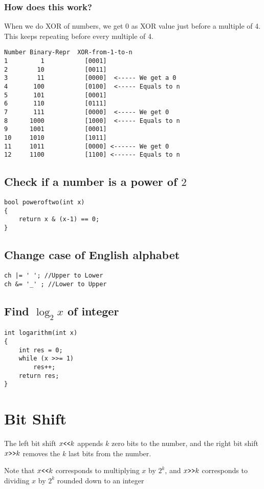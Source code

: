 \documentclass[twoside,12pt,a4paper,english]{book}
\theoremstyle{definition}
\theoremstyle{problemstyle}
\theoremstyle{problemstyle}
\theoremstyle{problemstyle}
\begin{document}
\subsubsection{How does this work?}
When we do XOR of numbers, we get 0 as XOR value just before a multiple of 4. This keeps repeating before every multiple of 4.
\begin{lstlisting}
Number Binary-Repr  XOR-from-1-to-n
1         1           [0001]
2        10           [0011]
3        11           [0000]  <----- We get a 0
4       100           [0100]  <----- Equals to n
5       101           [0001]
6       110           [0111]
7       111           [0000]  <----- We get 0
8      1000           [1000]  <----- Equals to n
9      1001           [0001]
10     1010           [1011]
11     1011           [0000] <------ We get 0
12     1100           [1100] <------ Equals to n
\end{lstlisting}
\newpage
\subsection{Check if a number is a power of \texorpdfstring{$2$}{2}}
\begin{lstlisting}
bool poweroftwo(int x)
{
    return x & (x-1) == 0;
}
\end{lstlisting}
\subsection{Change case of English alphabet}
\begin{lstlisting}
ch |= ' '; //Upper to Lower
ch &= '_' ; //Lower to Upper
\end{lstlisting}
\subsection{Find \texorpdfstring{$\log_2 x$}{log} of integer}
\begin{lstlisting}
int logarithm(int x)
{
    int res = 0;
    while (x >>= 1)
        res++;
    return res;
}
\end{lstlisting}
\section{Bit Shift}
The left bit shift $x \verb|<<| k$ appends $k$
zero bits to the number,
and the right bit shift $x \verb|>>| k$
removes the $k$ last bits from the number.

Note that $x \verb|<<| k$
corresponds to multiplying $x$ by $2^k$,
and $x \verb|>>| k$
corresponds to dividing $x$ by $2^k$
rounded down to an integer
\end{document}
